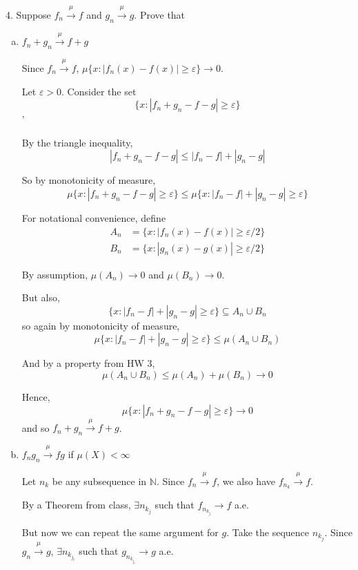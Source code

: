 \documentclass[12pt]{article}
\newcommand{\N}{\mathbb{N}}
\newcommand{\abs}[1]{\left\vert #1 \right\vert}
\newcommand{\ep}{\varepsilon}
\newcommand{\sub}{\subseteq}
\begin{document}
4. Suppose $f_n \overset{\mu}{\longrightarrow} f$ and $g_n \overset{\mu}{\longrightarrow} g$. Prove that 
\begin{enumerate}[(a)]
    \item $f_n + g_n \overset{\mu}{\longrightarrow} f + g$
    
    \color{blue}
        Since $f_n \overset{\mu}{\longrightarrow} f$, $\mu\{x: \abs{f_n(x) - f(x)} \geq \ep\} \to 0$. 

        Let $\ep > 0$. Consider the set 
        \[\{x: \abs{f_n + g_n - f - g} \geq \ep\}\]'

        By the triangle inequality, 
        \[\abs{f_n + g_n - f - g} \leq \abs{f_n - f} + \abs{g_n - g}\]

        So by monotonicity of measure, 
        \[\mu\{x: \abs{f_n + g_n - f - g} \geq \ep\} \leq \mu\{x: \abs{f_n - f} + \abs{g_n - g} \geq \ep\}\]

        For notational convenience, define 
        \begin{align*}
            A_n &= \{x: \abs{f_n(x) - f(x)} \geq \ep/2\}\\
            B_n &= \{x: \abs{g_n(x) - g(x)} \geq \ep/2\}
        \end{align*}

        By assumption, $\mu(A_n) \to 0$ and $\mu(B_n) \to 0$. 

        But also, 
        \[\{x: \abs{f_n - f} + \abs{g_n - g} \geq \ep\} \sub A_n \cup B_n\]
        so again by monotonicity of measure,
        \[\mu\{x: \abs{f_n - f} + \abs{g_n - g} \geq \ep\} \leq \mu(A_n \cup B_n)\] 

        And by a property from HW 3, 
        \[\mu(A_n \cup B_n) \leq \mu(A_n) + \mu(B_n) \to 0\]

        Hence, 
        \[\mu\{x: \abs{f_n + g_n - f - g} \geq \ep\} \to 0\]
        and so $f_n + g_n \overset{\mu}{\longrightarrow} f + g$.
    \color{black}

    \item $f_ng_n \overset{\mu}{\longrightarrow} fg$ if $\mu(X) < \infty$
    
    \color{blue}
        Let $n_k$ be any subsequence in $\N$. Since $f_n \overset{\mu}{\longrightarrow} f$, we also have $f_{n_k} \overset{\mu}{\longrightarrow} f$. 

        By a Theorem from class, $\exists n_{k_j}$ such that $f_{n_{k_j}} \to f$ a.e. 

        But now we can repeat the same argument for $g$. Take the sequence $n_{k_j}$. Since $g_n \overset{\mu}{\longrightarrow} g$, $\exists n_{k_{j_l}}$ such that $g_{n_{k_{j_l}}} \to g$ a.e.


\end{enumerate}
\end{document}
